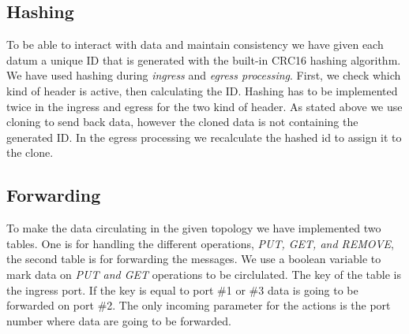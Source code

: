 \documentclass[sigconf,natbib=false]{acmart}
\begin{document}
\subsection{Hashing}
To be able to interact with data and maintain consistency we have given each datum a unique ID that is generated with the built-in CRC16 hashing \cite{hashing2} algorithm. We have used hashing during \textit{ingress} and \textit{egress processing}. First, we check which kind of header is active, then calculating the ID. Hashing has to be implemented twice in the ingress and egress for the two kind of header. As stated above we use cloning to send back data, however the cloned data is not containing the generated ID. In the egress processing we recalculate the hashed id to assign it to the clone.
\cite{scholz2019cryptographic}
\subsection{Forwarding}
To make the data circulating in the given topology we have implemented two tables. One is for handling the different operations, \textit{PUT, GET, and REMOVE}, the second table is for forwarding the messages. We use a boolean variable to mark data on \textit{PUT and GET} operations to be circlulated. The key of the table is the ingress port. If the key is equal to port \#1 or \#3 data is going to be forwarded on port \#2. The only incoming parameter for the actions is the port number where data are going to be forwarded.
\end{document}
